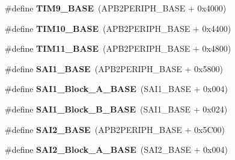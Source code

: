 \begin{DoxyCompactItemize}
\item 
\#define {\bfseries T\+I\+M9\+\_\+\+B\+A\+SE}~(A\+P\+B2\+P\+E\+R\+I\+P\+H\+\_\+\+B\+A\+SE + 0x4000)\hypertarget{group___peripheral__memory__map_ga92ae902be7902560939223dd765ece08}{}\label{group___peripheral__memory__map_ga92ae902be7902560939223dd765ece08}

\item 
\#define {\bfseries T\+I\+M10\+\_\+\+B\+A\+SE}~(A\+P\+B2\+P\+E\+R\+I\+P\+H\+\_\+\+B\+A\+SE + 0x4400)\hypertarget{group___peripheral__memory__map_ga3eff32f3801db31fb4b61d5618cad54a}{}\label{group___peripheral__memory__map_ga3eff32f3801db31fb4b61d5618cad54a}

\item 
\#define {\bfseries T\+I\+M11\+\_\+\+B\+A\+SE}~(A\+P\+B2\+P\+E\+R\+I\+P\+H\+\_\+\+B\+A\+SE + 0x4800)\hypertarget{group___peripheral__memory__map_ga3a4a06bb84c703084f0509e105ffaf1d}{}\label{group___peripheral__memory__map_ga3a4a06bb84c703084f0509e105ffaf1d}

\item 
\#define {\bfseries S\+A\+I1\+\_\+\+B\+A\+SE}~(A\+P\+B2\+P\+E\+R\+I\+P\+H\+\_\+\+B\+A\+SE + 0x5800)\hypertarget{group___peripheral__memory__map_ga24c1053b754946b512f9c31123e09d21}{}\label{group___peripheral__memory__map_ga24c1053b754946b512f9c31123e09d21}

\item 
\#define {\bfseries S\+A\+I1\+\_\+\+Block\+\_\+\+A\+\_\+\+B\+A\+SE}~(S\+A\+I1\+\_\+\+B\+A\+SE + 0x004)\hypertarget{group___peripheral__memory__map_ga31f72e5e5d7aea23bc8a5191bc32e900}{}\label{group___peripheral__memory__map_ga31f72e5e5d7aea23bc8a5191bc32e900}

\item 
\#define {\bfseries S\+A\+I1\+\_\+\+Block\+\_\+\+B\+\_\+\+B\+A\+SE}~(S\+A\+I1\+\_\+\+B\+A\+SE + 0x024)\hypertarget{group___peripheral__memory__map_gacdb59b321830def8c7a57c154178bc48}{}\label{group___peripheral__memory__map_gacdb59b321830def8c7a57c154178bc48}

\item 
\#define {\bfseries S\+A\+I2\+\_\+\+B\+A\+SE}~(A\+P\+B2\+P\+E\+R\+I\+P\+H\+\_\+\+B\+A\+SE + 0x5\+C00)\hypertarget{group___peripheral__memory__map_ga4b4d5c95ea5f835f9ac37fab90a2d700}{}\label{group___peripheral__memory__map_ga4b4d5c95ea5f835f9ac37fab90a2d700}

\item 
\#define {\bfseries S\+A\+I2\+\_\+\+Block\+\_\+\+A\+\_\+\+B\+A\+SE}~(S\+A\+I2\+\_\+\+B\+A\+SE + 0x004)\hypertarget{group___peripheral__memory__map_gad2992b5770984ddee4c1b7e325d238f3}{}\label{group___peripheral__memory__map_gad2992b5770984ddee4c1b7e325d238f3}


\end{DoxyCompactItemize}
